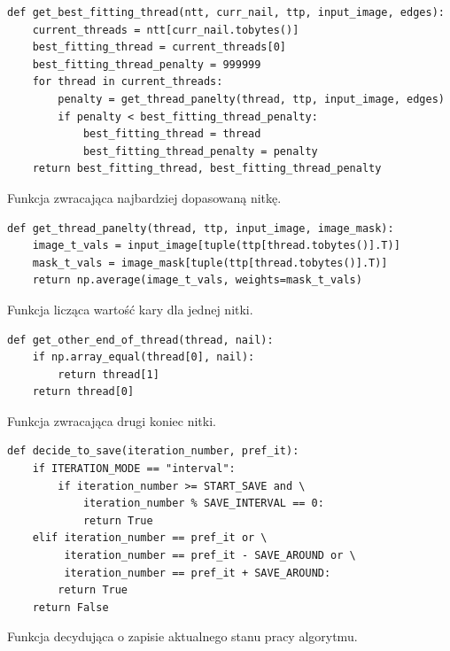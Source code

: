         \begin{code}[H]
        \begin{verbatim}
def get_best_fitting_thread(ntt, curr_nail, ttp, input_image, edges): 
    current_threads = ntt[curr_nail.tobytes()]
    best_fitting_thread = current_threads[0]
    best_fitting_thread_penalty = 999999
    for thread in current_threads:
        penalty = get_thread_panelty(thread, ttp, input_image, edges)
        if penalty < best_fitting_thread_penalty:
            best_fitting_thread = thread
            best_fitting_thread_penalty = penalty
    return best_fitting_thread, best_fitting_thread_penalty
        \end{verbatim}
        \caption{Funkcja zwracająca najbardziej dopasowaną nitkę.}
        \label{imp-art-algorithm-thread-select-code}
        \end{code}
        
        \begin{code}[H]
        \begin{verbatim}
def get_thread_panelty(thread, ttp, input_image, image_mask):
    image_t_vals = input_image[tuple(ttp[thread.tobytes()].T)] 
    mask_t_vals = image_mask[tuple(ttp[thread.tobytes()].T)] 
    return np.average(image_t_vals, weights=mask_t_vals)
        \end{verbatim}
        \caption{Funkcja licząca wartość kary dla jednej nitki.}
        \label{imp-art-algorithm-penalty-calc-code}
        \end{code}
        
        \begin{code}[H]
        \begin{verbatim}
def get_other_end_of_thread(thread, nail):
    if np.array_equal(thread[0], nail):
        return thread[1]
    return thread[0]
        \end{verbatim}
        \caption{Funkcja zwracająca drugi koniec nitki.}
        \label{imp-art-other-end-code}
        \end{code}
        
        \begin{code}[H]
        \begin{verbatim}
def decide_to_save(iteration_number, pref_it):
    if ITERATION_MODE == "interval":
        if iteration_number >= START_SAVE and \
            iteration_number % SAVE_INTERVAL == 0:
            return True
    elif iteration_number == pref_it or \
         iteration_number == pref_it - SAVE_AROUND or \
         iteration_number == pref_it + SAVE_AROUND:
        return True
    return False
        \end{verbatim}
        \caption{Funkcja decydująca o zapisie aktualnego stanu pracy algorytmu.}
        \label{imp-art-decide-save-code}
        \end{code}
        \newpage
        
